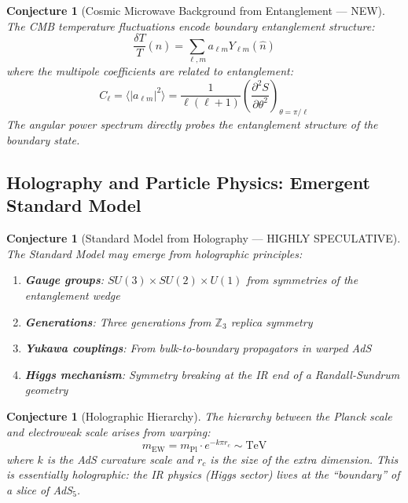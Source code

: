 \documentclass[12pt,a4paper]{article}
\newtheorem{conjecture}[theorem]{Conjecture}
\begin{document}
\begin{conjecture}[Cosmic Microwave Background from Entanglement --- NEW]
The CMB temperature fluctuations encode boundary entanglement structure:
\begin{equation}
\frac{\delta T}{T}(\hat{n}) = \sum_{\ell, m} a_{\ell m} Y_{\ell m}(\hat{n})
\end{equation}
where the multipole coefficients are related to entanglement:
\begin{equation}
C_\ell = \langle |a_{\ell m}|^2 \rangle = \frac{1}{\ell(\ell+1)} \left( \frac{\partial^2 S}{\partial \theta^2} \right)_{\theta = \pi/\ell}
\end{equation}
The angular power spectrum directly probes the entanglement structure of the boundary state.
\end{conjecture}

\subsection{Holography and Particle Physics: Emergent Standard Model}

\begin{conjecture}[Standard Model from Holography --- HIGHLY SPECULATIVE]
The Standard Model may emerge from holographic principles:
\begin{enumerate}
    \item \textbf{Gauge groups}: $SU(3) \times SU(2) \times U(1)$ from symmetries of the entanglement wedge
    \item \textbf{Generations}: Three generations from $\mathbb{Z}_3$ replica symmetry
    \item \textbf{Yukawa couplings}: From bulk-to-boundary propagators in warped AdS
    \item \textbf{Higgs mechanism}: Symmetry breaking at the IR end of a Randall-Sundrum geometry
\end{enumerate}
\end{conjecture}

\begin{conjecture}[Holographic Hierarchy]
The hierarchy between the Planck scale and electroweak scale arises from warping:
\begin{equation}
m_{\text{EW}} = m_{\text{Pl}} \cdot e^{-k \pi r_c} \sim \text{TeV}
\end{equation}
where $k$ is the AdS curvature scale and $r_c$ is the size of the extra dimension. This is essentially holographic: the IR physics (Higgs sector) lives at the ``boundary'' of a slice of AdS$_5$.
\end{conjecture}
\end{document}
